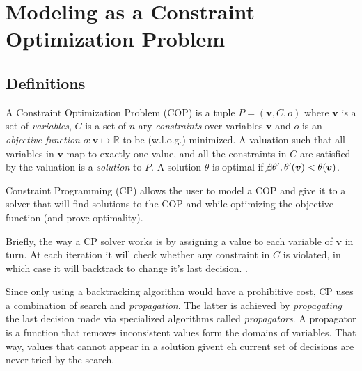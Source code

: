 \documentclass[letterpaper]{article} %
\newcommand{\ignore}[1]{}
\begin{document}
\section{Modeling as a Constraint Optimization Problem \label{SEC:CP}}
\subsection{Definitions}
A Constraint Optimization Problem (COP) is a tuple $P = (\boldsymbol{v},C,o)$ 
where $\boldsymbol{v}$ is a 
set of \emph{variables}, $C$ is a set of $n$-ary 
\emph{constraints} over variables $\boldsymbol{v}$ and $o$ is an 
\emph{objective function} $o : \boldsymbol{v} \mapsto \mathbb{R}$ to be 
(w.l.o.g.) minimized. 
A valuation such that all variables in $\boldsymbol{v}$ map 
to exactly one value, and all the constraints in $C$ are satisfied by the 
valuation is a \emph{solution} to $P$. A solution $\theta$ is optimal if$\not 
\exists \theta', \theta'(\boldsymbol{v}) < \theta(\boldsymbol{v})$.


\ignore{
A typical example of COP is the Traveling Salesman Problem, where we need to 
find a route that visits all cities in a region exactly one and is of minimal 
length.
}

Constraint Programming (CP) allows the user to model a COP and give it 
to a solver that will find solutions to the COP and while optimizing 
the objective function (and prove optimality).

Briefly, the way a CP solver works is by assigning a value to each variable of 
$\boldsymbol{v}$ in turn. At each iteration it will check whether any 
constraint in $C$ is violated, in which case it will backtrack to change it's 
last decision. \ignore{The choice of the order of the variables to be assigned, 
and the 
choice of the value to be assigned to each variable is called the \emph{search 
strategy}}.

Since only using a backtracking algorithm would have a prohibitive cost, CP 
uses a combination of search and \emph{propagation}. The latter is achieved by 
\emph{propagating} the last decision made via specialized algorithms called 
\emph{propagators}. A propagator is a function that removes inconsistent values 
form the domains of variables. That way, values that cannot appear in a 
solution givent eh current set of decisions are never tried by the search. 
\end{document}

